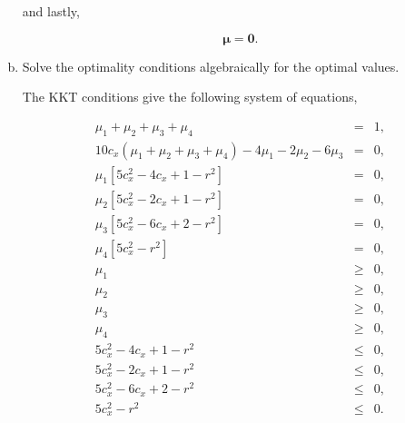\documentclass{article}
\begin{document}
\begin{enumerate}[a)]
and lastly,

\begin{equation*}
	\mathbf{\mu} = \mathbf{0}.
\end{equation*}




\item Solve the optimality conditions algebraically for the optimal values.

The KKT conditions give the following system of equations,

\begin{eqnarray}	
	\mu_1 + \mu_2 + \mu_3 + \mu_4 &=& 1, \label{eq:kkt1}\\
	10c_x(\mu_1 + \mu_2 + \mu_3 + \mu_4) - 4\mu_1 - 2\mu_2 - 6\mu_3 &=& 0, \label{eq:kkt2}\\
	\mu_1 \left[5c_x^2 - 4c_x + 1 -r^2\right] &=& 0, \label{eq:kkt3}\\
	\mu_2 \left[5c_x^2 - 2c_x + 1 -r^2\right] &=& 0, \label{eq:kkt4}\\
	\mu_3 \left[5c_x^2 - 6c_x + 2 -r^2\right] &=& 0, \label{eq:kkt5}\\
	\mu_4 \left[5c_x^2 -r^2\right] &=& 0, \label{eq:kkt6}\\
	\mu_1 &\ge& 0, \\
	\mu_2 &\ge& 0, \\
	\mu_3 &\ge& 0, \\
	\mu_4 &\ge& 0, \\
	5c_x^2 - 4c_x + 1 -r^2 &\le& 0, \label{eq:ineq1}\\
	5c_x^2 - 2c_x + 1 -r^2 &\le& 0, \label{eq:ineq2}\\
	5c_x^2 - 6c_x + 2 -r^2 &\le& 0, \label{eq:ineq3}\\
	5c_x^2 -r^2 &\le& 0. \label{eq:ineq4}
\end{eqnarray}


\end{enumerate}
\end{document}
